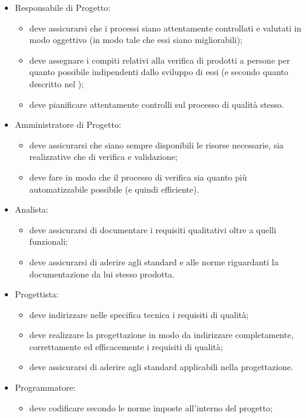 		\begin{itemize}
			\item Responsabile di Progetto:
			\begin{itemize}
				\item deve assicurarsi che i processi siano attentamente controllati e valutati in modo oggettivo (in modo tale che essi siano 
				migliorabili);
				\item deve assegnare i compiti relativi alla verifica di prodotti a persone per quanto possibile indipendenti dallo sviluppo di essi 
				(e secondo quanto descritto nel );
				\item deve pianificare attentamente controlli sul processo di qualità stesso.
			\end{itemize}
			\item Amministratore di Progetto:
			\begin{itemize}
				\item deve assicurarsi che siano sempre disponibili le risorse necessarie, sia realizzative che di verifica e validazione;
				\item deve fare in modo che il processo di verifica sia quanto più automatizzabile possibile (e quindi efficiente).
			\end{itemize}
			\item Analista:
			\begin{itemize}
				\item deve assicurarsi di documentare i requisiti qualitativi oltre a quelli funzionali;
				\item deve assicurarsi di aderire agli standard e alle norme riguardanti la documentazione da lui stesso prodotta.
			\end{itemize}
			\item Progettista:
			\begin{itemize}
				\item deve indirizzare nelle specifica tecnica i requisiti di qualità;
				\item deve realizzare la progettazione in modo da indirizzare completamente, correttamente ed efficacemente i requisiti di qualità;
				\item deve assicurarsi di aderire agli standard applicabili nella progettazione.
			\end{itemize}
			\item Programmatore:
			\begin{itemize}
				\item deve codificare secondo le norme imposte all'interno del progetto;

\end{itemize}
\end{itemize}
